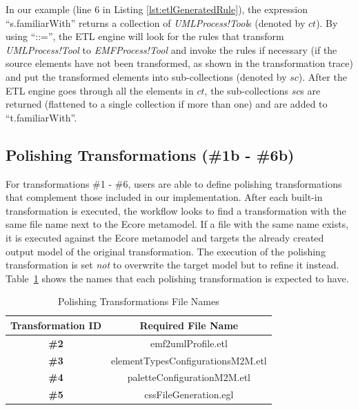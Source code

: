 
In our example (line 6 in Listing \ref{lst:etlGeneratedRule}), the expression ``s.familiarWith'' returns a collection of \emph{UMLProcess!Tool}s (denoted by $ct$). By using ``::='', the ETL engine will look for the rules that transform \emph{UMLProcess!Tool} to \emph{EMFProcess!Tool} and invoke the rules if 
necessary (if the source elements have not been transformed, as shown in the transformation trace) and put the transformed elements into sub-collections 
(denoted by $sc$). 
After the ETL engine goes through all the elements in $ct$, the sub-collections $sc$s are returned (flattened to a single collection if more than one) and are added to ``t.familiarWith''.



\subsection{Polishing Transformations (\#1b - \#6b)}
\label{sec:transformationPatches}
For transformations \#1 - \#6, users are able to define polishing transformations that complement those included in our implementation. 
After each built-in transformation is executed, the workflow looks to find a transformation with the same file name next to the Ecore metamodel. 
If a file with the same name exists, it is executed against the Ecore metamodel and targets the already created output model of the original transformation. 
The execution of the polishing transformation is set \textit{not} to overwrite the target model but to refine it instead.
Table~\ref{tab:polishingTransformationsNames} shows the names that each polishing transformation is expected to have.

\begin{table}[h]
	\caption{Polishing Transformations File Names}
	\centering
	\setlength{\tabcolsep}{3.5pt} 
	\begin{tabular}{|c|c|}
		\cline{1-2}
		\textbf{Transformation ID}  & \textbf{Required File Name}\\ \hline
		\textbf{\#2} & emf2umlProfile.etl\\ \hline
		\textbf{\#3} & elementTypesConfigurationsM2M.etl\\ \hline
		\textbf{\#4} & paletteConfigurationM2M.etl\\ \hline
		\textbf{\#5} & cssFileGeneration.egl\\ \hline
		\cline{1-2}
	\end{tabular}
	\label{tab:polishingTransformationsNames}
\end{table}
